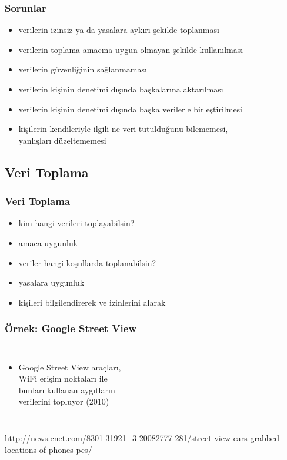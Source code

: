 \documentclass[dvipsnames]{beamer}
\theoremstyle{definition}
\theoremstyle{example}
\theoremstyle{plain}
\begin{document}
\begin{frame}
  \frametitle{Sorunlar}

  \begin{itemize}
    \item verilerin izinsiz ya da yasalara aykırı şekilde toplanması
    \item verilerin toplama amacına uygun olmayan şekilde kullanılması
    \item verilerin güvenliğinin sağlanmaması
    \item verilerin kişinin denetimi dışında başkalarına aktarılması
    \item verilerin kişinin denetimi dışında başka verilerle birleştirilmesi
    \item kişilerin kendileriyle ilgili ne veri tutulduğunu bilememesi,\\
      yanlışları düzeltememesi
  \end{itemize}
\end{frame}

\subsection{Veri Toplama}

\begin{frame}
  \frametitle{Veri Toplama}

  \begin{itemize}
    \item kim hangi verileri toplayabilsin?
    \item amaca uygunluk

    \pause
    \bigskip
    \item veriler hangi koşullarda toplanabilsin?
    \item yasalara uygunluk
    \item kişileri bilgilendirerek ve izinlerini alarak
  \end{itemize}
\end{frame}

\begin{frame}
  \frametitle{Örnek: Google Street View}

  \begin{columns}

    \begin{itemize}
      \item Google Street View araçları,\\
        WiFi erişim noktaları ile\\
        bunları kullanan aygıtların\\
        verilerini topluyor (2010)
    \end{itemize}
  \end{columns}

  \medskip
  \tiny{\url{http://news.cnet.com/8301-31921_3-20082777-281/street-view-cars-grabbed-locations-of-phones-pcs/}}\\
\end{frame}
\end{document}
